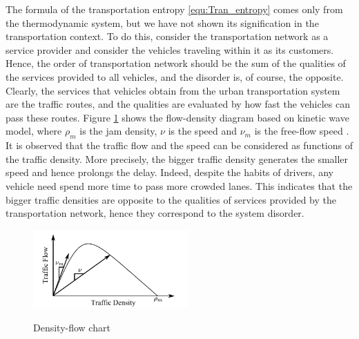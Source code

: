 \documentclass[preprint,authoryear,12pt]{elsarticle}
\begin{document}

The formula of the transportation entropy \eqref{equ:Tran_entropy} comes only from the thermodynamic system, but we have not shown its signification in the transportation context. To do this, consider the transportation network as a service provider and consider the vehicles traveling within it as its customers. Hence, the order of transportation network should be the sum of the qualities of the services provided to all vehicles, and the disorder is, of course, the opposite. Clearly, the services that vehicles obtain from the urban transportation system are the traffic routes, and the qualities are evaluated by how fast the vehicles can pass these routes. Figure \ref{fig:d_q} shows the flow-density diagram based on kinetic wave model, where $\rho_m$ is the jam density, $\nu$ is the speed and $\nu_m$ is the free-flow speed \citep{ukkusuri_robust_2010}. It is observed that the traffic flow and the speed can be considered as functions of the traffic density. More precisely, the bigger traffic density generates 
the smaller speed and hence prolongs the delay. Indeed, despite the habits of drivers, any vehicle need spend more time to pass more crowded lanes. This indicates that the bigger traffic densities are opposite to the qualities of services provided by the transportation network, hence they correspond to the system disorder.

\begin{figure}[ht]
  \centering
  \includegraphics[height=3cm]{pics/d-q}\\
  \caption{Density-flow chart}
  \label{fig:d_q}
\end{figure}
\end{document}
